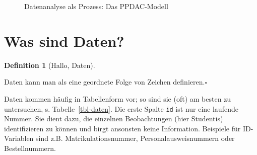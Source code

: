 \documentclass[
  letterpaper,
]{scrbook}
\theoremstyle{definition}
\theoremstyle{definition}
\newtheorem{definition}{Definition}[chapter]
\theoremstyle{definition}
\theoremstyle{remark}
\begin{document}
\begin{figure}


\caption{\label{fig-ppdac}Datenanalyse als Prozess: Das PPDAC-Modell}

\end{figure}%

\section{Was sind Daten?}\label{was-sind-daten}

\begin{definition}[Hallo,
Daten]\protect\hypertarget{def-daten}{}\label{def-daten}

Daten kann man als eine geordnete Folge von Zeichen
definieren.\(\square\)

\end{definition}

Daten kommen häufig in Tabellenform vor; so sind sie (oft) am besten zu
untersuchen, s. Tabelle~\ref{tbl-daten}. Die erste Spalte \texttt{id}
ist nur eine laufende Nummer. Sie dient dazu, die einzelnen
Beobachtungen (hier Studentis) identifizieren zu können und birgt
ansonsten keine Information. Beispiele für ID-Variablen sind z.B.
Matrikulationsnummer, Personalausweisnummern oder Bestellnummern.

\begin{table}

\caption{\label{tbl-daten}So sehen Daten in Form einer Tabelle aus.}


\end{table}%
\end{document}
